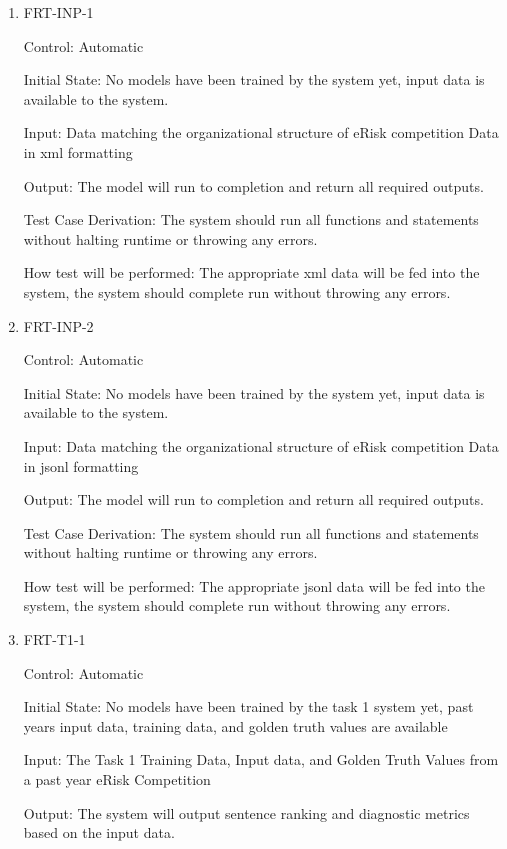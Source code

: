 \documentclass[12pt, titlepage]{article}
\begin{document}
\begin{enumerate}

\item{FRT-INP-1\\}

Control: Automatic

Initial State: No models have been trained by the system yet, input data is available to the system.

Input: Data matching the organizational structure of eRisk competition Data in xml formatting

Output: The model will run to completion and return all required outputs.

Test Case Derivation: The system should run all functions and statements without halting runtime or throwing any errors.

How test will be performed: The appropriate xml data will be fed into the system, the system should complete run without throwing any errors.

\item{FRT-INP-2\\}

Control: Automatic

Initial State: No models have been trained by the system yet, input data is available to the system.

Input: Data matching the organizational structure of eRisk competition Data in jsonl formatting

Output: The model will run to completion and return all required outputs.

Test Case Derivation: The system should run all functions and statements without halting runtime or throwing any errors.

How test will be performed: The appropriate jsonl data will be fed into the system, the system should complete run without throwing any errors.

\item{FRT-T1-1\\}

Control: Automatic

Initial State: No models have been trained by the task 1 system yet, past years input data, training data, and golden truth values are available

Input: The Task 1 Training Data, Input data, and Golden Truth Values from a past year eRisk Competition

Output: The system will output sentence ranking and diagnostic metrics based on the input data. 


\end{enumerate}
\end{document}
